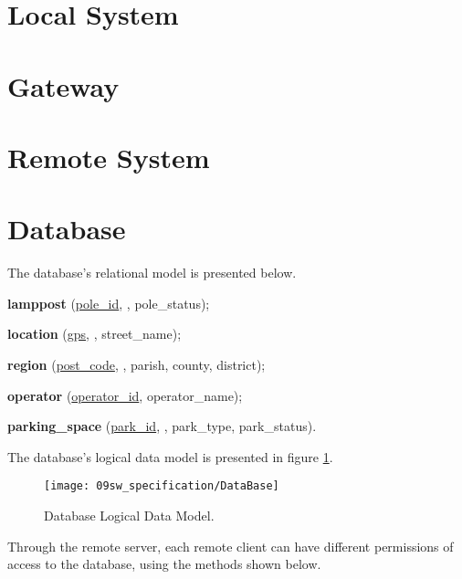 \section{Local System}


\clearpage
\section{Gateway}


\clearpage
\section{Remote System}


\clearpage
\section{Database}

The database's relational model is presented below.

\textbf{lamppost} (\underline{pole\_id}, , pole\_status);

\textbf{location} (\underline{gps}, , street\_name);

\textbf{region} (\underline{post\_code}, , parish, county, district);

\textbf{operator} (\underline{operator\_id}, operator\_name);

\textbf{parking\_space} (\underline{park\_id}, , park\_type, park\_status).

The database's logical data model is presented in figure \ref{fig:database_er}.

\begin{figure}[H]
	\centering	
	\texttt{[image: 09sw\_specification/DataBase]}
	\caption{Database Logical Data Model.}
	\label{fig:database_er}
\end{figure}

Through the remote server, each remote client can have different permissions of access to the database, using the methods shown below.

